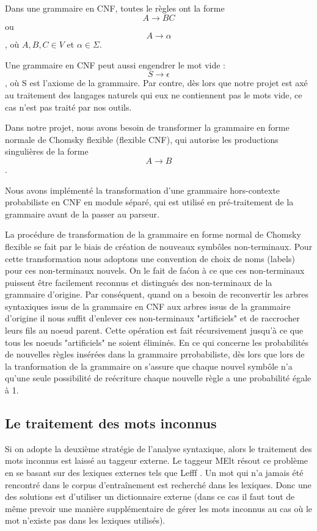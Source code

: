 \documentclass[12pt]{article}
\begin{document}
Dans une grammaire en
CNF, toutes le r\`egles ont la forme $$A \rightarrow BC$$ ou $$A \rightarrow
\alpha$$, o\`u $A,B,C \in V$ et $\alpha \in \Sigma$. \par

Une grammaire en CNF peut
aussi engendrer le mot vide : $$S \rightarrow \epsilon$$, o\`u S est l'axiome de
la grammaire. Par contre, d\`es lors que notre projet est ax\'e au traitement des langages naturels
qui eux ne contiennent pas le mots vide, ce cas n'est pas trait\'e par nos outils.
 
Dans notre projet, nous avons besoin de transformer la grammaire en forme
normale de Chomsky flexible (flexible CNF), qui autorise les productions
singuli\`eres de la forme $$A \rightarrow B$$. \par

Nous avons impl\'ement\'e la transformation d'une grammaire hors-contexte probabiliste en CNF en
module s\'epar\'e, qui est utilis\'e en pr\'e-traitement de la grammaire avant
de la passer au parseur. 

La proc\'edure de transformation de la grammaire en forme normal de Chomsky flexible
se fait par le biais de cr\'eation de nouveaux symb\^oles non-terminaux.
Pour cette transformation nous adoptons une convention de choix de noms (labels) pour ces non-terminaux
nouvels. On le fait de fa\'con \`a ce que ces non-terminaux puissent \^etre facilement reconnus et 
distingu\'es des non-terminaux de la grammaire d'origine. Par cons\'equent, quand on a besoin de reconvertir
les arbres syntaxiques issus de la grammaire en CNF aux arbres issus de la grammaire d'origine il nous suffit
d'enlever ces non-terminaux "artificiels" et de raccrocher leurs fils au noeud parent. Cette op\'eration est 
fait r\'ecursivement jusqu'\`a ce que tous les noeuds "artificiels" ne soient \'elimin\'es.
En ce qui concerne les probabilit\'es de nouvelles r\`egles ins\'er\'ees dans la grammaire prrobabiliste,
d\`es lors que lors de la tranformation de la grammaire on s'assure que chaque nouvel symb\^ole n'a qu'une
seule possibilit\'e de re\'ecriture chaque nouvelle r\`egle a une probabilit\'e \'egale \`a 1.

\subsection{Le traitement des mots inconnus}

Si on adopte la deuxi\`eme strat\'egie de l'analyse syntaxique, alors le
traitement des mots inconnus est laiss\'e au taggeur externe.
Le taggeur MElt r\'esout ce probl\`eme en se basant sur des lexiques externes tels
que Lefff \cite{Lefff}. Un mot qui n'a jamais \'et\'e rencontr\'e dans le corpus
d'entra\^inement est recherch\'e dans les lexiques. Donc une des solutions est
d'utiliser un dictionnaire externe (dans ce cas il faut tout de m\^eme prevoir
une mani\`ere suppl\'ementaire de g\'erer les mots inconnus au cas o\`u le mot n'existe
pas dans les lexiques utilis\'es).\par
\end{document}
